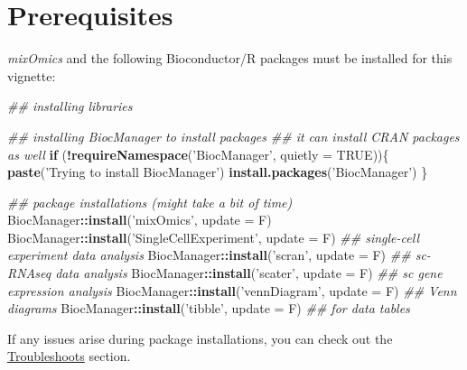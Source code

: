 \documentclass[]{book}
\newenvironment{Shaded}{\begin{snugshade}}{\end{snugshade}}
\newcommand{\CommentTok}[1]{\textcolor[rgb]{0.56,0.35,0.01}{\textit{#1}}}
\newcommand{\ControlFlowTok}[1]{\textcolor[rgb]{0.13,0.29,0.53}{\textbf{#1}}}
\newcommand{\DataTypeTok}[1]{\textcolor[rgb]{0.13,0.29,0.53}{#1}}
\newcommand{\KeywordTok}[1]{\textcolor[rgb]{0.13,0.29,0.53}{\textbf{#1}}}
\newcommand{\NormalTok}[1]{#1}
\newcommand{\OperatorTok}[1]{\textcolor[rgb]{0.81,0.36,0.00}{\textbf{#1}}}
\newcommand{\OtherTok}[1]{\textcolor[rgb]{0.56,0.35,0.01}{#1}}
\newcommand{\StringTok}[1]{\textcolor[rgb]{0.31,0.60,0.02}{#1}}
\theoremstyle{definition}
\theoremstyle{definition}
\theoremstyle{definition}
\theoremstyle{remark}
\begin{document}
\hypertarget{prerequisites}{%
\section{Prerequisites}\label{prerequisites}}

\emph{mixOmics} \citep{R-mixOmics} and the following Bioconductor/R
packages must be installed for this vignette:

\begin{Shaded}
\begin{Highlighting}[]
\CommentTok{## installing libraries}

\CommentTok{## installing BiocManager to install packages}
\CommentTok{## it can install CRAN packages as well}
\ControlFlowTok{if}\NormalTok{ (}\OperatorTok{!}\KeywordTok{requireNamespace}\NormalTok{(}\StringTok{'BiocManager'}\NormalTok{, }\DataTypeTok{quietly =} \OtherTok{TRUE}\NormalTok{))\{}
  \KeywordTok{paste}\NormalTok{(}\StringTok{'Trying to install BiocManager'}\NormalTok{)}
  \KeywordTok{install.packages}\NormalTok{(}\StringTok{'BiocManager'}\NormalTok{)}
\NormalTok{\}}

\CommentTok{## package installations (might take a bit of time)}
\NormalTok{BiocManager}\OperatorTok{::}\KeywordTok{install}\NormalTok{(}\StringTok{'mixOmics'}\NormalTok{, }\DataTypeTok{update =}\NormalTok{ F)}
\NormalTok{BiocManager}\OperatorTok{::}\KeywordTok{install}\NormalTok{(}\StringTok{'SingleCellExperiment'}\NormalTok{, }\DataTypeTok{update =}\NormalTok{ F) }\CommentTok{## single-cell experiment data analysis}
\NormalTok{BiocManager}\OperatorTok{::}\KeywordTok{install}\NormalTok{(}\StringTok{'scran'}\NormalTok{, }\DataTypeTok{update =}\NormalTok{ F) }\CommentTok{## sc-RNAseq data analysis}
\NormalTok{BiocManager}\OperatorTok{::}\KeywordTok{install}\NormalTok{(}\StringTok{'scater'}\NormalTok{, }\DataTypeTok{update =}\NormalTok{ F) }\CommentTok{## sc gene expression analysis}
\NormalTok{BiocManager}\OperatorTok{::}\KeywordTok{install}\NormalTok{(}\StringTok{'vennDiagram'}\NormalTok{, }\DataTypeTok{update =}\NormalTok{ F) }\CommentTok{## Venn diagrams}
\NormalTok{BiocManager}\OperatorTok{::}\KeywordTok{install}\NormalTok{(}\StringTok{'tibble'}\NormalTok{, }\DataTypeTok{update =}\NormalTok{ F) }\CommentTok{## for data tables}
\end{Highlighting}
\end{Shaded}

If any issues arise during package installations, you can check out the
\protect\hyperlink{troubleshoots}{Troubleshoots} section.
\end{document}
